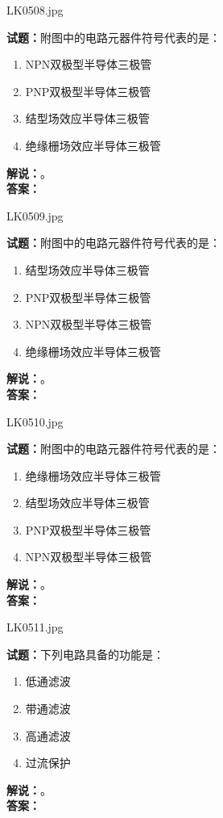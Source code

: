 \documentclass{ctexbook}
\begin{document}
\vspace{\baselineskip}

LK0508.jpg

\noindent\textbf{试题：}附图中的电路元器件符号代表的是：
\begin{enumerate}[leftmargin=3em]
  \item NPN双极型半导体三极管
  \item PNP双极型半导体三极管
  \item 结型场效应半导体三极管
  \item 绝缘栅场效应半导体三极管
\end{enumerate}
\noindent\textbf{解说：}\textbf{}。\\\noindent\textbf{答案：}

\vspace{\baselineskip}

LK0509.jpg

\noindent\textbf{试题：}附图中的电路元器件符号代表的是：
\begin{enumerate}[leftmargin=3em]
  \item 结型场效应半导体三极管
  \item PNP双极型半导体三极管
  \item NPN双极型半导体三极管
  \item 绝缘栅场效应半导体三极管
\end{enumerate}
\noindent\textbf{解说：}\textbf{}。\\\noindent\textbf{答案：}

\vspace{\baselineskip}

LK0510.jpg

\noindent\textbf{试题：}附图中的电路元器件符号代表的是：
\begin{enumerate}[leftmargin=3em]
  \item 绝缘栅场效应半导体三极管
  \item 结型场效应半导体三极管
  \item PNP双极型半导体三极管
  \item NPN双极型半导体三极管
\end{enumerate}
\noindent\textbf{解说：}\textbf{}。\\\noindent\textbf{答案：}

\vspace{\baselineskip}

LK0511.jpg

\noindent\textbf{试题：}下列电路具备的功能是：
\begin{enumerate}[leftmargin=3em]
  \item 低通滤波
  \item 带通滤波
  \item 高通滤波
  \item 过流保护
\end{enumerate}
\noindent\textbf{解说：}\textbf{}。\\\noindent\textbf{答案：}
\end{document}
